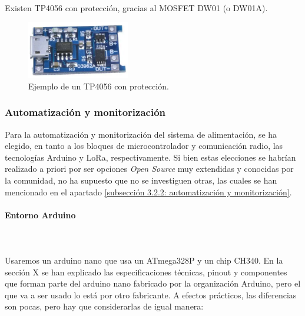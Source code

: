 \documentclass[12pt]{article}
\newcommand{\subsubsubsection}[1]{\paragraph{#1}\mbox{}\\}
\begin{document}
	\noindent Existen TP4056 con protección, gracias al MOSFET DW01 (o DW01A). \\
	
	\begin{figure}[h]
		\begin{center}
			\includegraphics[width=0.4\textwidth]{img/tp4056_withProtection.png}
			\caption{Ejemplo de un TP4056 con protección.}
			\label{TP4056 con protección}
		\end{center}
	\end{figure}
	

	\subsubsection{Automatización y monitorización}
	
	\noindent Para la automatización y monitorización del sistema de alimentación, se ha elegido, en tanto a los bloques de microcontrolador y  comunicación radio, las tecnologías Arduino y LoRa, respectivamente. Si bien estas elecciones se habrían realizado a priori por ser opciones \textit{Open Source} muy extendidas y conocidas por la comunidad, no ha supuesto que no se investiguen otras, las cuales se han mencionado en el apartado \ref{subsección 3.2.2: automatización y monitorización}.
	
	\subsubsubsection{Entorno Arduino}
	
	
	 \\
	
	\noindent Usaremos un arduino nano que usa un ATmega328P y un chip CH340. En la sección X se han explicado las especificaciones técnicas, pinout y componentes que forman parte del arduino nano fabricado por la organización Arduino, pero el que va a ser usado lo está por otro fabricante. A efectos prácticos, las diferencias son pocas, pero hay que considerarlas de igual manera:
	
\end{document}
